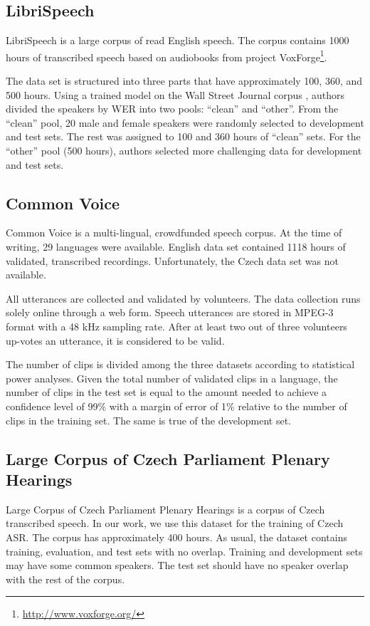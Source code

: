 \subsection{LibriSpeech}
LibriSpeech  is a large corpus of read English speech. The corpus contains 1000 hours of transcribed speech based on audiobooks from project VoxForge\footnote{\url{http://www.voxforge.org/}}.

The data set is structured into three parts that have approximately 100, 360, and 500 hours. Using a trained model on the Wall Street Journal corpus , authors divided the speakers by WER into two pools: ``clean'' and ``other''. From the ``clean'' pool, 20 male and female speakers were randomly selected to development and test sets. The rest was assigned to 100 and 360 hours of ``clean'' sets. For the ``other'' pool (500 hours), authors selected more challenging data for development and test sets.

\subsection{Common Voice}

Common Voice  is a multi-lingual, crowdfunded speech corpus. At the time of writing, 29 languages were available. English data set contained 1118 hours of validated, transcribed recordings. Unfortunately, the Czech data set was not available.

All utterances are collected and validated by volunteers. The data collection runs solely online through a web form. Speech utterances are stored in MPEG-3 format with a 48 kHz sampling rate. After at least two out of three volunteers up-votes an utterance, it is considered to be valid.

The number of clips is divided among the three datasets according to statistical power analyses.  Given the total number of validated clips in a language, the number of clips in the test set is equal to the amount needed to achieve a confidence level of 99\% with a margin of error of 1\% relative to the number of clips in the training set.  The same is true of the development set.

\subsection{Large Corpus of Czech Parliament Plenary Hearings}
Large Corpus of Czech Parliament Plenary Hearings  is a corpus of Czech transcribed speech. In our work, we use this dataset for the training of Czech ASR. The corpus has approximately 400 hours. As usual, the dataset contains training, evaluation, and test sets with no overlap. Training and development sets may have some common speakers. The test set should have no speaker overlap with the rest of the corpus.

